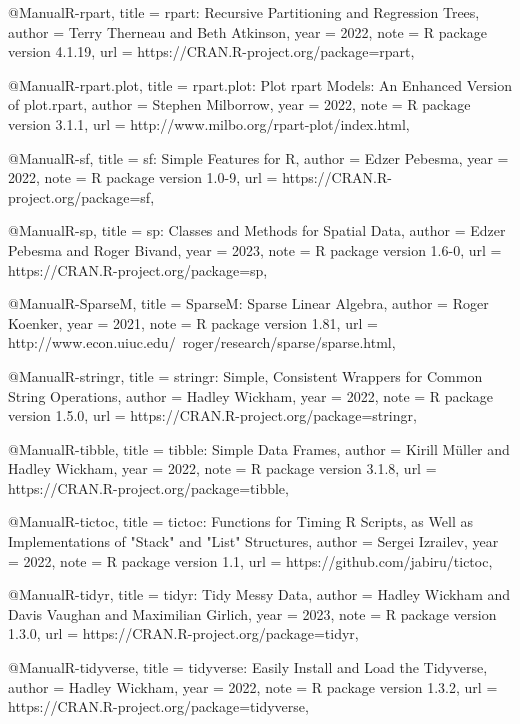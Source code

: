 @Manual{R-rpart,
  title = {rpart: Recursive Partitioning and Regression Trees},
  author = {Terry Therneau and Beth Atkinson},
  year = {2022},
  note = {R package version 4.1.19},
  url = {https://CRAN.R-project.org/package=rpart},
}

@Manual{R-rpart.plot,
  title = {rpart.plot: Plot rpart Models: An Enhanced Version of plot.rpart},
  author = {Stephen Milborrow},
  year = {2022},
  note = {R package version 3.1.1},
  url = {http://www.milbo.org/rpart-plot/index.html},
}

@Manual{R-sf,
  title = {sf: Simple Features for R},
  author = {Edzer Pebesma},
  year = {2022},
  note = {R package version 1.0-9},
  url = {https://CRAN.R-project.org/package=sf},
}

@Manual{R-sp,
  title = {sp: Classes and Methods for Spatial Data},
  author = {Edzer Pebesma and Roger Bivand},
  year = {2023},
  note = {R package version 1.6-0},
  url = {https://CRAN.R-project.org/package=sp},
}

@Manual{R-SparseM,
  title = {SparseM: Sparse Linear Algebra},
  author = {Roger Koenker},
  year = {2021},
  note = {R package version 1.81},
  url = {http://www.econ.uiuc.edu/~roger/research/sparse/sparse.html},
}

@Manual{R-stringr,
  title = {stringr: Simple, Consistent Wrappers for Common String Operations},
  author = {Hadley Wickham},
  year = {2022},
  note = {R package version 1.5.0},
  url = {https://CRAN.R-project.org/package=stringr},
}

@Manual{R-tibble,
  title = {tibble: Simple Data Frames},
  author = {Kirill Müller and Hadley Wickham},
  year = {2022},
  note = {R package version 3.1.8},
  url = {https://CRAN.R-project.org/package=tibble},
}

@Manual{R-tictoc,
  title = {tictoc: Functions for Timing R Scripts, as Well as Implementations of
"Stack" and "List" Structures},
  author = {Sergei Izrailev},
  year = {2022},
  note = {R package version 1.1},
  url = {https://github.com/jabiru/tictoc},
}

@Manual{R-tidyr,
  title = {tidyr: Tidy Messy Data},
  author = {Hadley Wickham and Davis Vaughan and Maximilian Girlich},
  year = {2023},
  note = {R package version 1.3.0},
  url = {https://CRAN.R-project.org/package=tidyr},
}

@Manual{R-tidyverse,
  title = {tidyverse: Easily Install and Load the Tidyverse},
  author = {Hadley Wickham},
  year = {2022},
  note = {R package version 1.3.2},
  url = {https://CRAN.R-project.org/package=tidyverse},
}

